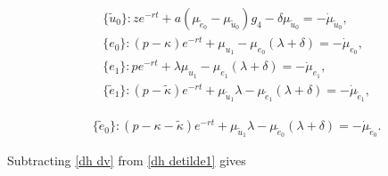 \documentclass[12pt]{article} %
\theoremstyle{definition}
\begin{document}
\begin{appendix}
\begin{fleqn}
\begin{align}
& \{\tilde{u}_0\}:ze^{-rt} +a(\mu_{\tilde{e}_0}-\mu_{\tilde{u}_0})g_4 -\delta\mu_{\tilde{u}_0}=-\dot{\mu}_{\tilde{u}_0} \label{dh dutilde0}, \\
& \{e_0\}:(p-\kappa)e^{-rt}+\mu_{u_1}-\mu_{e_0}(\lambda+\delta)=-\dot{\mu}_{e_0}, \label{dh de0} \\
& \{e_1\}: pe^{-rt}+\lambda\mu_{u_1}-\mu_{e_1}(\lambda+\delta)=-\dot{\mu}_{e_1}, \label{dh de1} \\
& \{\tilde{e}_1\}:(p-\tilde{\kappa})e^{-rt}+\mu_{\tilde{u}_1}\lambda - \mu_{\tilde{e}_1}(\lambda+\delta)=-\dot{\mu}_{\tilde{e}_1}, \label{dh detilde1} 
\end{align}
\end{fleqn}

\newpage
\begin{fleqn}
\begin{align}
&\{\tilde{e}_0\}:(p-\kappa-\tilde{\kappa})e^{-rt}+\mu_{\tilde{u}_1}\lambda - \mu_{\tilde{e}_0}(\lambda+\delta)=-\dot{\mu}_{\tilde{e}_0}. \label{dh detilde0}
\end{align}
\end{fleqn}


\noindent Subtracting \eqref{dh dv} from \eqref{dh detilde1} gives


\end{appendix}
\end{document}
